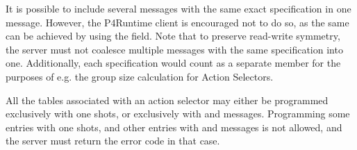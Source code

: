 \documentclass[11pt]{article}
\begin{document}
{%
It is possible to include several  messages with the same
exact  specification in one  message. However,
the P4Runtime client is encouraged not to do so, as the same can be achieved by
using the  field. Note that to preserve read-write symmetry, the server
must not coalesce multiple  messages with the same 
specification into one. Additionally, each  specification would count as
a separate member for the purposes of e.g. the  group size
calculation for Action Selectors.%

All the tables associated with an action selector may either be programmed
exclusively with one shots, or exclusively with  and
 messages. Programming some entries with one shots, and
other entries with  and  messages is
not allowed, and the server must return the error code  in
that case.%

}
\end{document}
